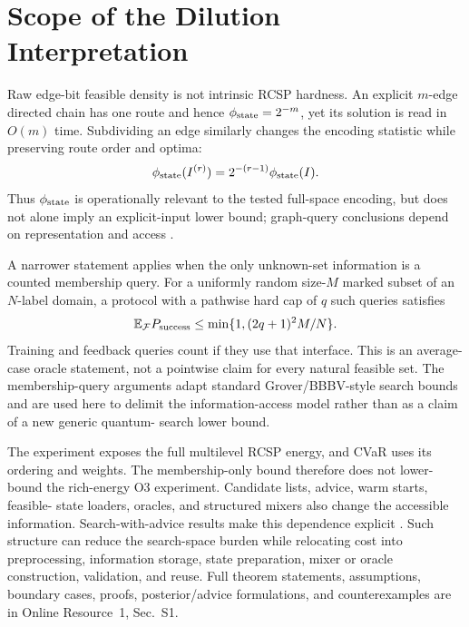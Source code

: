 \section{Scope of the Dilution Interpretation}
\label{sec:theory}

Raw edge-bit feasible density is not intrinsic RCSP hardness. An explicit
$m$-edge directed chain has one route and hence $\phi_{\mathrm{state}}=2^{-m}$, yet its
solution is read in $O(m)$ time. Subdividing an edge similarly changes the
encoding statistic while preserving route order and optima:
\begin{equation}
 \phi_{\mathrm{state}}(I^{(r)})=2^{-(r-1)}\phi_{\mathrm{state}}(I).
 \label{eq:padding}
\end{equation}
Thus $\phi_{\mathrm{state}}$ is operationally relevant to the tested full-space encoding,
but does not alone imply an explicit-input lower bound; graph-query conclusions
depend on representation and access \cite{durr2006graph,galperin1983succinct}.

A narrower statement applies when the only unknown-set information is a
counted membership query. For a uniformly random size-$M$ marked subset of an
$N$-label domain, a protocol with a pathwise hard cap of $q$ such queries
satisfies
\begin{equation}
 \mathbb E_{\mathcal F}P_{\rm success}
 \leq \min\{1,(2q+1)^2M/N\}.
 \label{eq:membership-bound}
\end{equation}
Training and feedback queries count if they use that interface. This is an
average-case oracle statement, not a pointwise claim for every natural
feasible set. The membership-query arguments adapt standard Grover/BBBV-style
search bounds \cite{bennett1997strengths,boyer1998tight,zalka1999optimal,
hoyer2000arbitrary,brassard2002amplitude} and are used here to delimit the
information-access model rather than as a claim of a new generic quantum-
search lower bound.

The experiment exposes the full multilevel RCSP energy, and CVaR uses its
ordering and weights. The membership-only bound therefore does not lower-bound
the rich-energy O3 experiment. Candidate lists, advice, warm starts, feasible-
state loaders, oracles, and structured mixers also change the accessible
information. Search-with-advice results make this dependence explicit
\cite{montanaro2010advice,he2021prior,nayebi2015inverting,
chung2020advice,konig2009entropy,anderson2024easier}. Such structure can reduce
the search-space burden while relocating cost into preprocessing, information
storage, state preparation, mixer or oracle construction, validation, and
reuse. Full theorem statements, assumptions, boundary cases, proofs,
posterior/advice formulations, and counterexamples are in Online Resource~1,
Sec.~S1.
